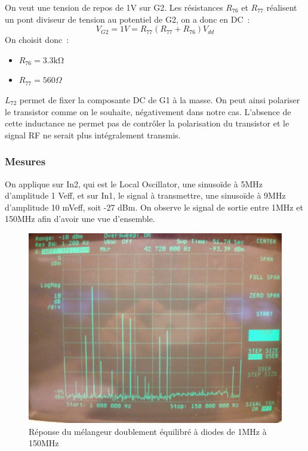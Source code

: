 \documentclass{article}
\begin{document}

On veut une tension de repos de 1V sur G2.
Les résistances $R_{76}$ et $R_{77}$ réalisent un pont diviseur de tension au potentiel de G2, on a donc en DC~:
\begin{equation*}
V_{G2}=1V={R_{77}}{(R_{77}+R_{76})}V_{dd}
\end{equation*}
On choisit donc~:
\begin{itemize}
\item $R_{76}= 3.3 \mathrm{k\Omega}$
\item $R_{77}= 560 \Omega$
\end{itemize}


$L_{72}$ permet de fixer la composante DC de G1 à la masse. On peut ainsi polariser le transistor comme on le souhaite, négativement dans notre cas. L'absence de cette inductance ne permet pas de contrôler la polarisation du transistor et le signal RF ne serait plus intégralement transmis.

\subsubsection{Mesures}


On applique sur In2, qui est le Local Oscillator, une sinusoïde à 5MHz d'amplitude 1 Veff, et sur In1, le signal à transmettre, une sinusoïde à 9MHz d'amplitude 10 mVeff, soit -27 dBm.
On observe le signal de sortie entre 1MHz et 150MHz afin d'avoir une vue d'ensemble.
\begin{figure}[h!]
	\centering
	\includegraphics[width=.7\textwidth]{10_3_1}
	\caption{Réponse du mélangeur doublement équilibré à diodes de 1MHz à 150MHz}
	\label{fig:10_3_1}
\end{figure}
\end{document}
